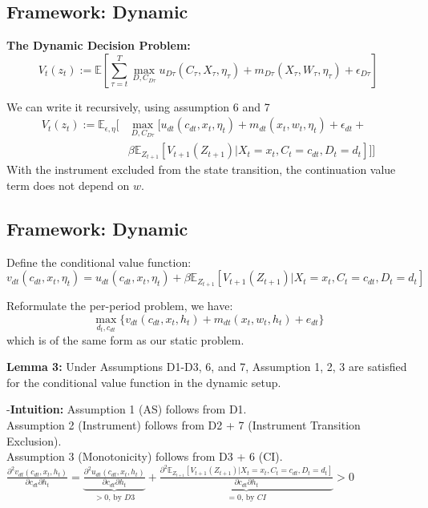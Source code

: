 \documentclass[
  letterpaper,
  DIV=11,
  numbers=noendperiod]{scrartcl}
\begin{document}
\subsection{Framework: Dynamic}\label{framework-dynamic-1}

\textbf{The Dynamic Decision Problem:}
\[V_t(z_t) := \mathbb{E}[\sum_{\tau=t}^{T} \max_{D,C_{D \tau}} u_{D\tau}(C_{\tau}, X_{\tau}, \eta_{\tau}) + m_{D \tau}(X_{\tau}, W_{\tau}, \eta_{\tau}) + \epsilon_{D \tau}] \]

We can write it recursively, using assumption 6 and 7 \[
\begin{align}
V_t(z_t) := \mathbb{E}_{\epsilon,\eta}[&\max_{D,C_{D \tau}}[ u_{dt}(c_{dt}, x_{t}, \eta_{t}) + m_{dt}(x_{t}, w_{t}, \eta_{t}) + \epsilon_{dt} + \\
& \beta \mathbb{E}_{Z_{t+1}}[V_{t+1}(Z_{t+1})|X_t=x_t,C_t=c_{dt},D_t=d_t]]] 
\end{align}
\] With the instrument excluded from the state transition, the
continuation value term does not depend on \(w\).

\subsection{Framework: Dynamic}\label{framework-dynamic-2}

Define the conditional value function:
\[v_{dt}(c_{dt},x_t,\eta_t) = u_{dt}(c_{dt}, x_{t}, \eta_{t}) + \beta \mathbb{E}_{Z_{t+1}}[V_{t+1}(Z_{t+1})|X_t=x_t,C_t=c_{dt},D_t=d_t]\]

Reformulate the per-period problem, we have:
\[\max_{d_t, c_{dt}} \{v_{dt}(c_{dt},x_t,h_t) + m_{dt}(x_t,w_t,h_t) + e_{dt} \}\]
which is of the same form as our static problem.

\textbf{Lemma 3:} Under Assumptions D1-D3, 6, and 7, Assumption 1, 2, 3
are satisfied for the conditional value function in the dynamic setup.

-\textbf{Intuition:} Assumption 1 (AS) follows from D1.\\
Assumption 2 (Instrument) follows from D2 + 7 (Instrument Transition
Exclusion).\\
Assumption 3 (Monotonicity) follows from D3 + 6 (CI).\\

\(\frac{\partial^2v_{dt}(c_{dt},x_t,h_t)}{\partial c_{dt} \partial h_t} = \underbrace{\frac{\partial^2u_{dt}(c_{dt},x_t,h_t)}{\partial c_{dt} \partial h_t}}_{>0 \text{, by } D3} + \underbrace{\frac{\partial^2 \mathbb{E}_{Z_{t+1}}[V_{t+1}(Z_{t+1})|X_t=x_t,C_t=c_{dt},D_t=d_t]}{\partial c_{dt} \partial h_t}}_{=0 \text{, by } CI} > 0\)
\end{document}
